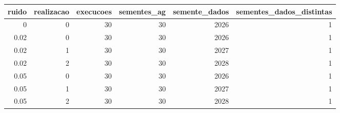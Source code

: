 \begin{tabular}{rrrrrr}
\toprule
ruido & realizacao & execucoes & sementes\_ag & semente\_dados & sementes\_dados\_distintas \\
\midrule
0 & 0 & 30 & 30 & 2026 & 1 \\
0.02 & 0 & 30 & 30 & 2026 & 1 \\
0.02 & 1 & 30 & 30 & 2027 & 1 \\
0.02 & 2 & 30 & 30 & 2028 & 1 \\
0.05 & 0 & 30 & 30 & 2026 & 1 \\
0.05 & 1 & 30 & 30 & 2027 & 1 \\
0.05 & 2 & 30 & 30 & 2028 & 1 \\
\bottomrule
\end{tabular}
